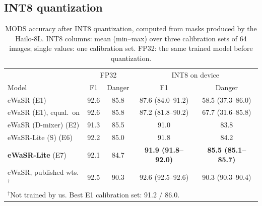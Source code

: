 \documentclass[conference]{IEEEtran}
\begin{document}
\subsection{INT8 quantization}
\label{sec:quant}
\begin{table}[t]
\centering
\caption{MODS accuracy after INT8 quantization, computed from masks produced by the Hailo-8L. INT8 columns: mean (min--max) over three calibration sets of 64 images; single values: one calibration set. FP32: the same trained model before quantization.}
\label{tab:quant}
\setlength{\tabcolsep}{2.2pt}
\begin{tabular}{lcccc}
\toprule
& \multicolumn{2}{c}{FP32} & \multicolumn{2}{c}{INT8 on device} \\
Model & F1 & Danger & F1 & Danger \\
\midrule
eWaSR (E1)                & 92.6 & 85.8 & 87.6 (84.0--91.2) & 58.5 (37.3--86.0) \\
eWaSR (E1), equal.\ on    & 92.6 & 85.8 & 87.2 (81.8--90.2) & 67.7 (31.6--85.8) \\
eWaSR (D-mixer) (E2)      & 91.3 & 85.5 & 91.0 & 83.8 \\
eWaSR-Lite (S) (E6)       & 92.2 & 85.0 & 91.8 & 84.2 \\
\textbf{eWaSR-Lite} (E7)  & 92.1 & 84.7 & \textbf{91.9 (91.8--92.0)} & \textbf{85.5 (85.1--85.7)} \\
\midrule
eWaSR, published wts.$^\dagger$ & 92.5 & 90.3 & 92.6 (92.5--92.6) & 90.3 (90.3--90.4) \\
\bottomrule
\multicolumn{5}{l}{\footnotesize $^\dagger$Not trained by us. Best E1 calibration set: 91.2 / 86.0.}
\end{tabular}
\end{table}
\end{document}
